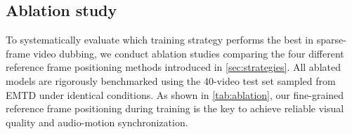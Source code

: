 \subsection{Ablation study}
% 
To systematically evaluate which training strategy performs the best in sparse-frame video dubbing, we conduct ablation studies comparing the four different reference frame positioning methods introduced in \cref{sec:strategies}. 
All ablated models are rigorously benchmarked using the 40-video test set sampled from EMTD under identical conditions.
As shown in \cref{tab:ablation}, our fine-grained reference frame positioning during training is the key to achieve reliable visual quality and audio-motion synchronization.
